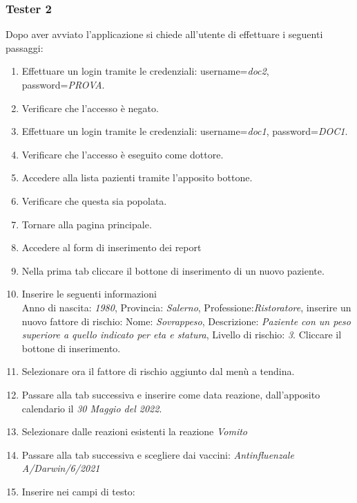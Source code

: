 \documentclass[11pt]{article}
\begin{document}
            \subsubsection*{Tester 2}
            Dopo aver avviato l'applicazione si chiede all'utente di effettuare i seguenti passaggi:
            \begin{enumerate}
                \item Effettuare un login tramite le credenziali: username=\textit{doc2}, password=\textit{PROVA}.
                \item Verificare che l'accesso è negato.
                \item Effettuare un login tramite le credenziali: username=\textit{doc1}, password=\textit{DOC1}.
                \item Verificare che l'accesso è eseguito come dottore.
                \item Accedere alla lista pazienti tramite l'apposito bottone.
                \item Verificare che questa sia popolata.
                \item Tornare alla pagina principale.
                \item Accedere al form di inserimento dei report
                \item Nella prima tab cliccare il bottone di inserimento di un nuovo paziente.
                \item Inserire le seguenti informazioni\\
                        Anno di nascita: \textit{1980}, Provincia: \textit{Salerno}, Professione:\textit{Ristoratore}, 
                        inserire un nuovo fattore di rischio: Nome: \textit{Sovrappeso}, Descrizione: \textit{Paziente con un peso superiore a quello indicato per eta e statura}, Livello di rischio: \textit{3}. Cliccare il bottone di inserimento.
                \item Selezionare ora il fattore di rischio aggiunto dal menù a tendina.
                \item Passare alla tab successiva e inserire come data reazione, dall'apposito calendario il \textit{30 Maggio del 2022}.
                \item Selezionare dalle reazioni esistenti la reazione \textit{Vomito}
                \item Passare alla tab successiva e scegliere dai vaccini: \textit{Antinfluenzale A/Darwin/6/2021}
                \item Inserire nei campi di testo:\\

\end{enumerate}
\end{document}
